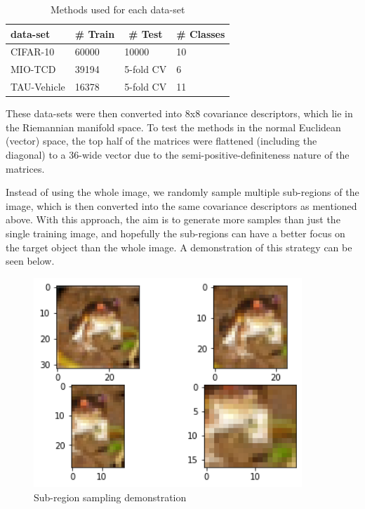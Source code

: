 \documentclass[12pt]{article}
\begin{document}
\begin{sloppypar}
\begin{table}[hbt!]
\centering
\caption{Methods used for each data-set}
\label{tab:method-table}
\begin{tabular}{llll}
\hline
\textbf{data-set}    & \multicolumn{1}{c}{\textbf{\# Train}} & \multicolumn{1}{c}{\textbf{\# Test}} & \multicolumn{1}{c}{\textbf{\# Classes}} \\ \hline
CIFAR-10            & 60000                                 & 10000                                & 10                                      \\
MIO-TCD             & 39194                                 & 5-fold CV                            & 6                                       \\
TAU-Vehicle         & 16378                           & 5-fold CV                            & 11                                      \\
\end{tabular}
\end{table}
\vspace{5mm}
\noindent
These data-sets were then converted into 8x8 covariance descriptors, which lie in the Riemannian manifold space. To test the methods in the normal Euclidean (vector) space, the top half of the matrices were flattened (including the diagonal) to a 36-wide vector due to the semi-positive-definiteness nature of the matrices.

\noindent
Instead of using the whole image, we randomly sample multiple sub-regions of the image, which is then converted into the same covariance descriptors as mentioned above. With this approach, the aim is to generate more samples than just the single training image, and hopefully the sub-regions can have a better focus on the target object than the whole image. A demonstration of this strategy can be seen below.

\begin{figure}[hbt!]
\caption{Sub-region sampling demonstration}
\label{img:subregion_sampling}
\centering
\includegraphics[width=0.9\textwidth]{subregion_sampling.png}
\end{figure}


\end{sloppypar}
\end{document}
